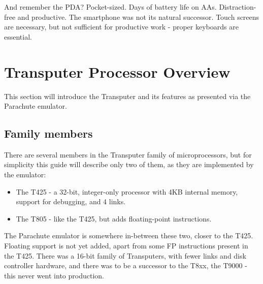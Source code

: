 \documentclass[a4paper]{tufte-book}
\begin{document}
And remember the PDA? Pocket-sized. Days of battery life on AAs. Distraction-free and productive. The smartphone was not its natural successor. Touch screens are necessary, but not sufficient for productive work - proper keyboards are essential. 


\section{Transputer Processor Overview}
This section will introduce the Transputer and its features as presented via the Parachute emulator.

\vspace{5mm}
 

\subsection{Family members}
There are several members in the Transputer family of microprocessors, but for simplicity this guide will describe only two of them, as they are implemented by the emulator:
\begin{itemize}
	\item The T425 - a 32-bit, integer-only processor with 4KB internal memory, support for debugging, and 4 links.
	\item The T805 - like the T425, but adds floating-point instructions. 
\end{itemize}

The Parachute emulator is somewhere in-between these two, closer to the T425. Floating support is not yet added, apart from some FP  instructions present in the T425. There was a 16-bit family of Transputers, with fewer links and disk controller hardware, and there was to be a successor to the T8xx, the T9000 - this never went into production.

\end{document}
